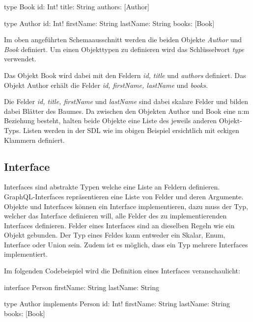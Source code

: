 \begin{JsCode}
type Book {
    id: Int!
    title: String
    authors: [Author]
}
    
type Author {
    id: Int!
    firstName: String
    lastName: String
    books: [Book]
}
\end{JsCode}

Im oben angeführten Schemaausschnitt werden die beiden Objekte \textit{Author} und \textit{Book} definiert.
Um einen Objekttypen zu definieren wird das Schlüsselwort \textit{type} verwendet.

Das Objekt Book wird dabei mit den Feldern \textit{id, title} und \textit{authors} definiert.
Das Objekt Author erhält die Felder \textit{id, firstName, lastName} und \textit{books}.

Die Felder \textit{id, title, firstName} und \textit{lastName} sind dabei skalare Felder und bilden dabei Blätter des Baumes.
Da zwischen den Objekten Author und Book eine n:m Beziehung besteht, halten beide Objekte eine Liste des jeweils anderen Objekt-Typs.
Listen werden in der SDL wie im obigen Beispiel ersichtlich mit eckigen Klammern definiert.

\subsection{Interface}

Interfaces sind abstrakte Typen welche eine Liste an Feldern definieren.
GraphQL-Interfaces repräsentieren eine Liste von Felder und deren Argumente.
Objekte und Interfaces können ein Interface implementieren, dazu muss der Typ, welcher das Interface definieren will, alle Felder des zu implementierenden Interfaces definieren.
\newline
\cite[Abs. 3.7]{graphqlOnline}
Felder eines Interfaces sind an dieselben Regeln wie ein Objekt gebunden.
Der Typ eines Feldes kann entweder ein Skalar, Enum, Interface oder Union sein.
Zudem ist es möglich, dass ein Typ mehrere Interfaces implementiert.
\cite[S.65-66]{kress2020graphql}
\newline


Im folgenden Codebeispiel wird die Definition eines Interfaces veranschaulicht:

\begin{JsCode}
interface Person {
    firstName: String
    lastName: String
}

type Author implements Person {
    id: Int!
    firstName: String
    lastName: String
    books: [Book]
}
\end{JsCode}

